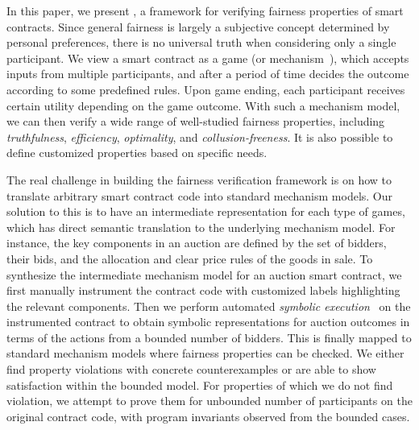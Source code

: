 
In this paper, we present \tool, a framework for verifying fairness properties of smart contracts.
Since general fairness is largely a subjective concept determined by personal preferences, there is
no universal truth when considering only a single participant.
We view a smart contract as a game (or mechanism~\cite{jackson2014mechanism,nisan2001algorithmic}),
which accepts inputs from multiple participants, and after a period of time decides the outcome
according to some predefined rules.
Upon game ending, each participant receives certain utility depending on the game outcome.
With such a mechanism model, we can then verify a wide range of well-studied fairness properties,
including \emph{truthfulness}, \emph{efficiency}, \emph{optimality}, and \emph{collusion-freeness}.
It is also possible to define customized properties based on specific needs.

The real challenge in building the fairness verification framework is on how to translate arbitrary
smart contract code into standard mechanism models.
Our solution to this is to have an intermediate representation for each type of games, which has
direct semantic translation to the underlying mechanism model.
For instance, the key components in an auction are defined by the set of bidders, their bids, and
the allocation and clear price rules of the goods in sale.
To synthesize the intermediate mechanism model for an auction smart contract, we first manually
instrument the contract code with customized labels highlighting the relevant components.
Then we perform automated \emph{symbolic execution}~\cite{king1976symbolic} on the instrumented
contract to obtain symbolic representations for auction outcomes in terms of the actions from a
bounded number of bidders.
This is finally mapped to standard mechanism models where fairness properties can be checked.
We either find property violations with concrete counterexamples or are able to show satisfaction
within the bounded model.
For properties of which we do not find violation, we attempt to prove them for unbounded number of
participants on the original contract code, with program invariants observed from the bounded cases.

